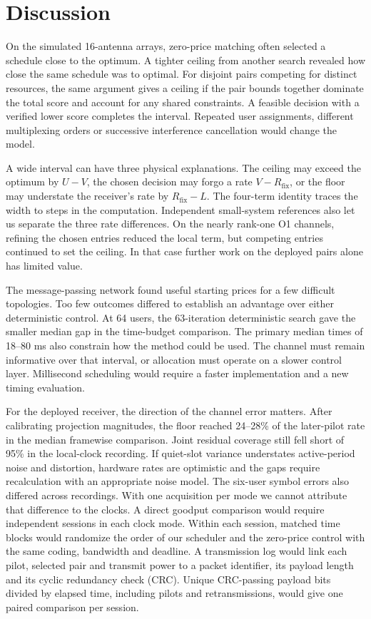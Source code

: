 \documentclass[11pt,letterpaper]{article}
\newcommand{\fix}{R_{\mathrm{fix}}}
\begin{document}
\section*{Discussion}

On the simulated 16-antenna arrays, zero-price matching often selected a schedule close to the optimum. A tighter ceiling from another search revealed how close the same schedule was to optimal. For disjoint pairs competing for distinct resources, the same argument gives a ceiling if the pair bounds together dominate the total score and account for any shared constraints. A feasible decision with a verified lower score completes the interval. Repeated user assignments, different multiplexing orders or successive interference cancellation would change the model.

A wide interval can have three physical explanations. The ceiling may exceed the optimum by \(U-V\), the chosen decision may forgo a rate \(V-\fix\), or the floor may understate the receiver's rate by \(\fix-L\). The four-term identity traces the width to steps in the computation. Independent small-system references also let us separate the three rate differences. On the nearly rank-one O1 channels, refining the chosen entries reduced the local term, but competing entries continued to set the ceiling. In that case further work on the deployed pairs alone has limited value.

The message-passing network found useful starting prices for a few difficult topologies. Too few outcomes differed to establish an advantage over either deterministic control. At 64 users, the 63-iteration deterministic search gave the smaller median gap in the time-budget comparison. The primary median times of 18--80 ms also constrain how the method could be used. The channel must remain informative over that interval, or allocation must operate on a slower control layer. Millisecond scheduling would require a faster implementation and a new timing evaluation.

For the deployed receiver, the direction of the channel error matters. After calibrating projection magnitudes, the floor reached 24--28\% of the later-pilot rate in the median framewise comparison. Joint residual coverage still fell short of 95\% in the local-clock recording. If quiet-slot variance understates active-period noise and distortion, hardware rates are optimistic and the gaps require recalculation with an appropriate noise model. The six-user symbol errors also differed across recordings. With one acquisition per mode we cannot attribute that difference to the clocks. A direct goodput comparison would require independent sessions in each clock mode. Within each session, matched time blocks would randomize the order of our scheduler and the zero-price control with the same coding, bandwidth and deadline. A transmission log would link each pilot, selected pair and transmit power to a packet identifier, its payload length and its cyclic redundancy check (CRC). Unique CRC-passing payload bits divided by elapsed time, including pilots and retransmissions, would give one paired comparison per session.
\end{document}
